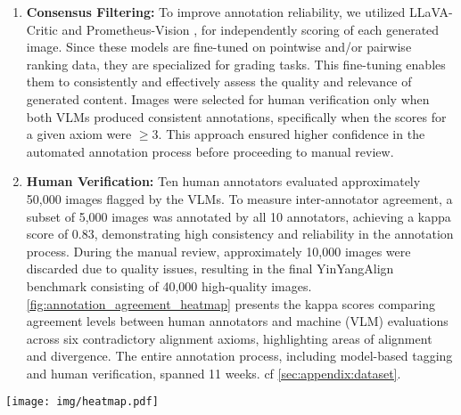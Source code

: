 \begin{enumerate}
   \item \textbf{Consensus Filtering:} To improve annotation reliability, we utilized LLaVA-Critic \cite{xiong2024llavacriticlearningevaluatemultimodal} and Prometheus-Vision \cite{lee2024prometheusvisionvisionlanguagemodeljudge}, for independently scoring of each generated image. Since these models are fine-tuned on pointwise and/or pairwise ranking data, they are specialized for grading tasks. This fine-tuning enables them to consistently and effectively assess the quality and relevance of generated content. Images were selected for human verification only when both VLMs produced consistent annotations, specifically when the scores for a given axiom were $\geq 3$. This approach ensured higher confidence in the automated annotation process before proceeding to manual review.  

    \item \textbf{Human Verification:}  
    Ten human annotators evaluated approximately 50,000 images flagged by the VLMs. To measure inter-annotator agreement, a subset of 5,000 images was annotated by all 10 annotators, achieving a kappa score of 0.83, demonstrating high consistency and reliability in the annotation process. During the manual review, approximately 10,000 images were discarded due to quality issues, resulting in the final YinYangAlign benchmark consisting of 40,000 high-quality images. \cref{fig:annotation_agreement_heatmap} presents the kappa scores comparing agreement levels between human annotators and machine (VLM) evaluations across six contradictory alignment axioms, highlighting areas of alignment and divergence. The entire annotation process, including model-based tagging and human verification, spanned 11 weeks. cf \cref{sec:appendix:dataset}. 


\end{enumerate}

\vspace{-4mm}

\begin{figure*}[h!]
    \centering
    \texttt{[image: img/heatmap.pdf]}
    \vspace{-6mm}
    \caption{\textit{Annotation Agreement Heatmap}: The VLM column represents the kappa score indicating the average agreement between GPT-4o and LLaVA across all axioms. Columns (H1--H10) correspond to the kappa scores measuring the agreement between each specific human annotator and the consolidated VLM annotations. Higher scores (darker blue) signify stronger agreement, while lower scores (lighter shades) highlight areas of disagreement.}
    \label{fig:annotation_agreement_heatmap}
    \vspace{-4mm}
\end{figure*}




